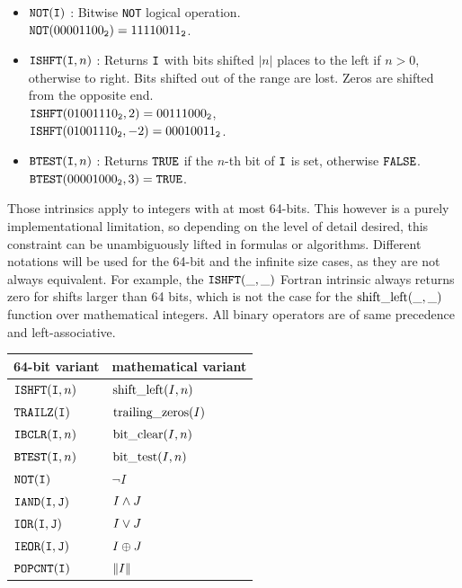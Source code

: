 \documentclass[./thesis.tex]{subfiles}
\begin{document}
\begin{sloppypar}
\begin{itemize}
	      
	\item $\text{\texttt{NOT}}({\texttt{I}})$ : Bitwise \texttt{NOT} logical operation. \\
        ${\text{\texttt{NOT}}({00001100_{\mathtt{2}}}) = {11110011_{\mathtt{2}}}}$.
	      
	\item $\text{\texttt{ISHFT}}({\texttt{I}},n)$ : Returns ${\texttt{I}}$ with bits shifted $|n|$ places to the left if $n>0$, otherwise to right. Bits shifted out of the range are lost. Zeros are shifted from the opposite end. \\
        ${\text{\texttt{ISHFT}}({01001110_{\mathtt{2}}},2) = {00111000_{\mathtt{2}}}}$, \\
        ${\text{\texttt{ISHFT}}({01001110_{\mathtt{2}}},-2) = {00010011_{\mathtt{2}}}}$.
	      
	\item $\text{\texttt{BTEST}}({\texttt{I}},n)$ : Returns ${\text{\texttt{TRUE}}}$ if the $n$-th bit of ${\texttt{I}}$ is set, otherwise ${\text{\texttt{FALSE}}}$. \\
        $\text{\texttt{BTEST}}({00001000_{\mathtt{2}}},3) = {\text{\texttt{TRUE}}}$.
	      
\end{itemize}
\end{sloppypar}
      
      
Those intrinsics apply to integers with at most 64-bits. This however is a purely implementational limitation, so depending on the level of detail desired, this constraint can be unambiguously lifted in formulas or algorithms. Different notations will be used for the 64-bit and the infinite size cases, as they are not always equivalent.
For example, the $\text{\texttt{ISHFT}}(\_,\_)$ Fortran intrinsic always returns zero for shifts larger than 64 bits, which is not the case for the $\text{shift\_left}(\_,\_)$ function over mathematical integers.
All binary operators are of same precedence and left-associative.

\begin{center}
  \begin{tabular}{l@{\hskip 10ex}l}
\hline
  64-bit variant  &  mathematical variant \\
\hline
    $\text{\texttt{ISHFT}}({\texttt{I}},n)$ & $\text{shift\_left}(I,n)$  \\ 
    $\text{\texttt{TRAILZ}}({\texttt{I}})$ & $\text{trailing\_zeros}(I)$  \\ 
    $\text{\texttt{IBCLR}}({\texttt{I}},n)$ & $\text{bit\_clear}(I,n)$  \\ 
    $\text{\texttt{BTEST}}({\texttt{I}},n)$ & $\text{bit\_test}(I,n)$  \\ 
    $\text{\texttt{NOT}}({\texttt{I}})$ & $\neg I $  \\ 
    $\text{\texttt{IAND}}({\texttt{I}},{{\texttt{J}}})$ & $I \wedge J$ \\
    $\text{\texttt{IOR}}({\texttt{I}},{{\texttt{J}}})$ & $I \vee J$ \\
    $\text{\texttt{IEOR}}({\texttt{I}},{{\texttt{J}}})$ & $I \oplus J$ \\
    $\text{\texttt{POPCNT}}({\texttt{I}})$ & $\norm{I}$ \\
\hline
  \end{tabular}
\end{center}
\end{document}
